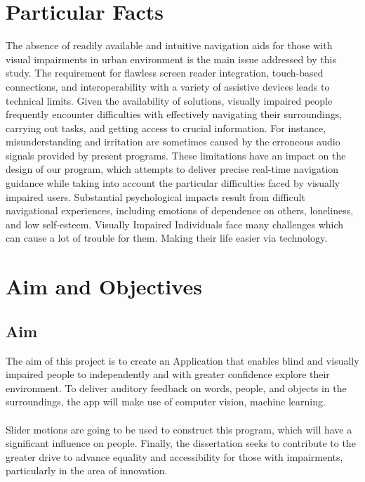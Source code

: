 \documentclass[MScCS]{uccthesis}
\begin{document}
   \section{Particular Facts}
    The absence of readily available and intuitive navigation aids for those with visual impairments in urban environment is the main issue addressed by this study. The requirement for flawless screen reader integration, touch-based connections, and interoperability with a variety of assistive devices leads to technical limits. Given the availability of solutions, visually impaired people frequently encounter difficulties with effectively navigating their surroundings, carrying out tasks, and getting access to crucial information. For instance, misunderstanding and irritation are sometimes caused by the erroneous audio signals provided by present programs. These limitations have an impact on the design of our program, which attempts to deliver precise real-time navigation guidance while taking into account the particular difficulties faced by visually impaired users. Substantial psychological impacts result from difficult navigational experiences, including emotions of dependence on others, loneliness, and low self-esteem. Visually Impaired Individuals face many challenges which can cause a lot of trouble for them. Making their life easier via technology.
    
   \section{Aim and Objectives}
   \subsection{Aim}
   The aim of this project is to create an Application that enables blind and visually impaired people to independently and with greater confidence explore their environment. To deliver auditory feedback on words, people, and objects in the surroundings, the app will make use of computer vision, machine learning.\\
   \\Slider motions are going to be used to construct this program, which will have a significant influence on people. Finally, the dissertation seeks to contribute to the greater drive to advance equality and accessibility for those with impairments, particularly in the area of innovation.
\end{document}
